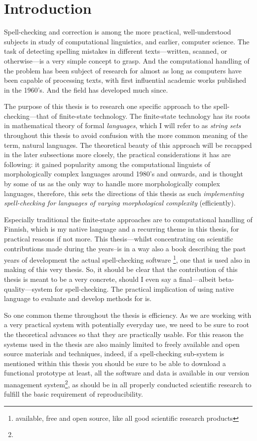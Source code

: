 \documentclass[officiallayout]{unihelcompling}
\begin{document}
\chapter{Introduction}
\label{chap:introduction}

Spell-checking and correction is among the more practical, well-understood
subjects in study of computational linguistics, and earlier, computer science.
The task of detecting spelling mistakes in different texts---written, scanned,
or otherwise---is a very simple concept to grasp. And the computational
handling of the problem has been subject of research for almost as long as
computers have been capable of processing texts, with first influential
academic works published in the 1960's. And the field has developed much since.

The purpose of this thesis is to research one specific approach to the
spell-checking---that of finite-state technology. The finite-state technology
has its roots in mathematical theory of formal \emph{languages}, which I will
refer to as \emph{string sets} throughout this thesis to avoid confusion with
the more common meaning of the term, natural languages. The theoretical beauty
of this approach will be recapped in the later subsections more closely, the
practical considerations it has are following: it gained popularity among the
computational linguists of morphologically complex languages around 1980's and
onwards, and is thought by some of us as the only way to handle more
morphologically complex languages, therefore, this sets the directions of this
thesis as such \emph{implementing spell-checking for languages of varying
morphological complexity} (efficiently). 

Especially traditional the finite-state approaches are to computational
handling of Finnish, which is my native language and a recurring theme in this
thesis, for practical reasons if not more. This thesis---whilst concentrating on
scientific contributions made during the years--is in a way also a book 
describing the past years of development the actual spell-checking software
\footnote{available, free and open source, like all good
scientific research products}, one that is used also in making of this very
thesis. So, it should be clear that the contribution of this thesis is meant
to be a very concrete, should I even say a final---albeit beta-quality---system
for spell-checking. The practical implication of using native language to
evaluate and develop methods for is.

So one common theme throughout the thesis is efficiency. As we are working with
a very practical system with potentially everyday use, we need to be sure to
root the theoretical advances so that they are practically usable. For this
reason the systems used in the thesis are also mainly limited to freely
available and open source materials and techniques, indeed, if a spell-checking
sub-system is mentioned within this thesis you should be sure to be able to
download a functional prototype at least, all the software and data is
available in our version management system\footnote{}, as should be in all
properly conducted scientific research to fulfill the basic requirement of
reproducibility.
\end{document}
